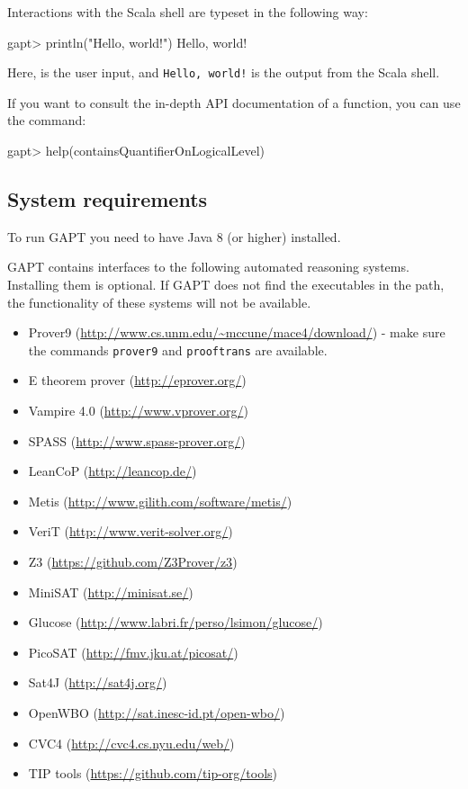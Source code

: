 \documentclass[a4paper,11pt]{article}
\newcommand{\cli}[1]{{\ttfamily {#1}}}
\begin{document}
Interactions with the Scala shell are typeset in the following way:
\begin{clilisting}
gapt> println("Hello, world!")
Hello, world!

\end{clilisting}
Here, {\bfseries \cli{println("Hello, world!")}} is the user input, and \texttt{Hello,
world!} is the output from the Scala shell.

If you want to consult the in-depth API documentation of a function, you can
use the \cli{help} command:
\begin{clilisting}
gapt> help(containsQuantifierOnLogicalLevel)

\end{clilisting}

\subsection{System requirements}
\label{sec:sysreq}

To run GAPT you need to have Java 8 (or higher) installed.

GAPT contains interfaces to the following automated reasoning systems. Installing
them is optional. If GAPT does not find the executables in the path, the
functionality of these systems will not be available.

\begin{itemize}
\item Prover9 (\url{http://www.cs.unm.edu/~mccune/mace4/download/}) - make sure
  the commands \texttt{prover9} and \texttt{prooftrans} are available.
\item E theorem prover (\url{http://eprover.org/})
\item Vampire 4.0 (\url{http://www.vprover.org/})
\item SPASS (\url{http://www.spass-prover.org/})
\item LeanCoP (\url{http://leancop.de/})
\item Metis (\url{http://www.gilith.com/software/metis/})
\item VeriT (\url{http://www.verit-solver.org/})
\item Z3 (\url{https://github.com/Z3Prover/z3})
\item MiniSAT (\url{http://minisat.se/})
\item Glucose (\url{http://www.labri.fr/perso/lsimon/glucose/})
\item PicoSAT (\url{http://fmv.jku.at/picosat/})
\item Sat4J (\url{http://sat4j.org/})
\item OpenWBO (\url{http://sat.inesc-id.pt/open-wbo/})
\item CVC4 (\url{http://cvc4.cs.nyu.edu/web/})
\item TIP tools (\url{https://github.com/tip-org/tools})
\end{itemize}
\end{document}
